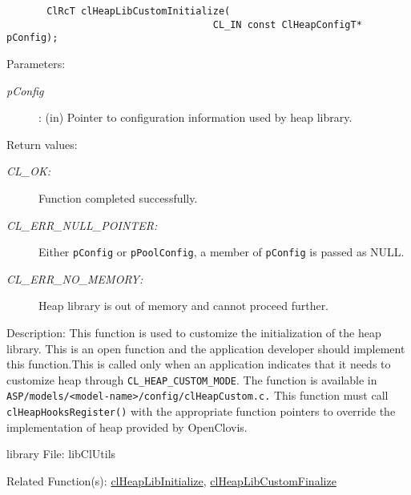 \begin{flushleft}
\begin{Desc}
\footnotesize\begin{verbatim}       ClRcT clHeapLibCustomInitialize(
                        			CL_IN const ClHeapConfigT* pConfig);
\end{verbatim}
\normalsize
\end{Desc}
\begin{Desc}
\item[Parameters:]
\begin{description}
\item[{\em pConfig}]: (in) Pointer to configuration information used by heap library.
\end{description}
\end{Desc}
\begin{Desc}
\item[Return values:]
\begin{description}
\item[{\em CL\_\-OK:}] Function completed successfully.
\item[{\em CL\_\-ERR\_\-NULL\_\-POINTER:}] Either {\tt{pConfig}} or {\tt{pPoolConfig}}, a member of {\tt{pConfig}} is passed as NULL.
\item[{\em CL\_\-ERR\_\-NO\_\-MEMORY:}] Heap library is out of memory and cannot proceed further.
\end{description}
\end{Desc}
\begin{Desc}
\item[Description:]
This function is used to customize the initialization of the heap library.
This is an open function and the application developer should implement this function.This is called only
when an application indicates that it needs to customize heap through
{\tt{CL\_\-HEAP\_\-CUSTOM\_\-MODE}}. The function is
available in {\tt{ASP/models/<model-name>/config/clHeapCustom.c.}}
This function must call {\tt{clHeapHooksRegister()}} with the appropriate
function pointers to override the implementation of heap provided by
OpenClovis.
\end{Desc}
\begin{Desc}
\item[library File:]lib\-Cl\-Utils\end{Desc}
\begin{Desc}
\item[Related Function(s):]\hyperlink{pageheap101}{clHeapLibInitialize}, \hyperlink{pageheap131}{clHeapLibCustomFinalize}
\end{Desc}
\newpage





\end{flushleft}

